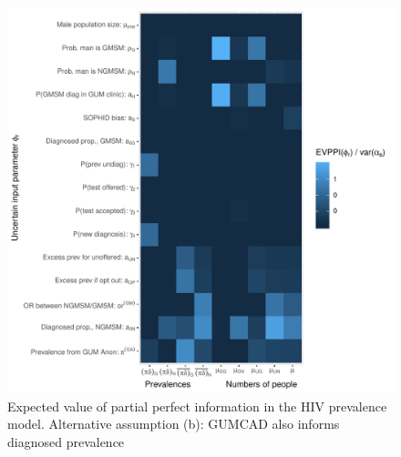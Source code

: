 \documentclass[12pt]{article}\usepackage[]{graphicx}\usepackage[]{color}
\makeatletter
\def\maxwidth{ %
  \ifdim\Gin@nat@width>\linewidth
    \linewidth
  \else
    \Gin@nat@width
  \fi
}
\newenvironment{knitrout}{}{} %
\makeatother
\begin{document}
\begin{figure}
\begin{knitrout}
\color{fgcolor}
\includegraphics[width=\maxwidth]{figure/evppi-gudnd-1} 

\end{knitrout}
  \caption{Expected value of partial perfect information in the HIV prevalence model.  Alternative assumption (b): GUMCAD also informs diagnosed prevalence }
  \label{fig:res:evppi}
\end{figure}
\end{document}
